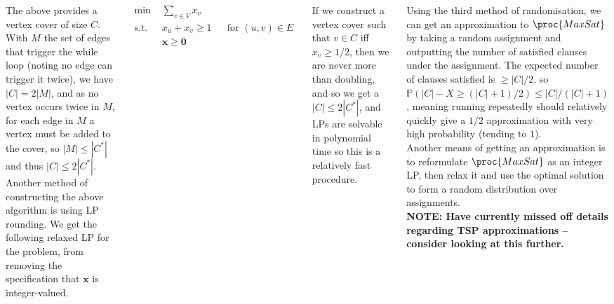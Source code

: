 \documentclass{tikzposter} %
\begin{document}
\begin{columns}
{  The above provides a vertex cover of size $C$. With $M$ the set of edges that trigger the while loop (noting no edge can trigger it twice), we have $|C| = 2|M|$, and as no vertex occurs twice in $M$, for each edge in $M$ a vertex must be added to the cover, so $|M| \le |C^{*}|$ and thus $|C| \le 2|C^{*}|$. \\

  Another method of constructing the above algorithm is using LP rounding. We get the following relaxed LP for the problem, from removing the specification that $\bm{x}$ is integer-valued.

  \begin{align*}
    \min \,\,&\sum_{v \in V} x_{v} \\
    \text{s.t. }&x_{u} + x_{v} \ge 1 && \text{for $(u,v) \in E$} \\
    &\bm{x} \ge \bm{0}
  \end{align*}

  If we construct a vertex cover such that $v \in C$ iff $x_{v} \ge 1/2$, then we are never more than doubling, and so we get a $|C| \le 2|C^{*}|$, and LPs are solvable in polynomial time so this is a relatively fast procedure. \\

  \hphantom{}

  Using the third method of randomisation, we can get an approximation to $\proc{MaxSat}$ by taking a random assignment and outputting the number of satisfied clauses under the assignment. The expected number of clauses satisfied is $\ge |C|/2$, so $\mathbb{P}(|C|-X \ge (|C|+1)/2) \le |C|/(|C|+1)$, meaning running repeatedly should relatively quickly give a $1/2$ approximation with very high probability (tending to $1$).\\

  Another means of getting an approximation is to reformulate $\proc{MaxSat}$ as an integer LP, then relax it and use the optimal solution to form a random distribution over assignments. \\

  \textbf{NOTE: Have currently missed off details regarding TSP approximations -- consider looking at this further.}
  }




\end{columns}
\end{document}
